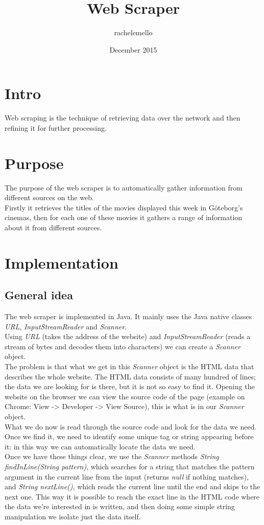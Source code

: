 \documentclass{article}
\title{Web Scraper}
\author{rachelemello }
\date{December 2015}
\begin{document}
\maketitle
\section{Intro}
Web scraping is the technique of retrieving data over the network and then refining it for further processing.


\section{Purpose}
The purpose of the web scraper is to automatically gather information from different sources on the web.\\
Firstly it retrieves the titles of the movies displayed this week in Göteborg's cinemas, then for each one of these movies it gathers a range of information about it from different sources.

\section{Implementation}
\subsection{General idea}
The web scraper is implemented in Java. It mainly uses the Java native classes \textit{URL}, \textit{InputStreamReader} and \textit{Scanner}.\\
Using \textit{URL} (takes the address of the website) and \textit{InputStreamReader} (reads a stream of bytes and decodes them into characters) we can create a \textit{Scanner} object. \\
The problem is that what we get in this \textit{Scanner} object is the HTML data that describes the whole website. The HTML data consists of many hundred of lines; the data we are looking for is there, but it is not so easy to find it. Opening the website on the browser we can view the source code of the page (example on Chrome: View -> Developer -> View Source), this is what is in our \textit{Scanner} object.\\
What we do now is read through the source code and look for the data we need. Once we find it, we need to identify some unique tag or string appearing before it: in this way we can automatically locate the data we need.\\
Once we have these things clear, we use the \textit{Scanner} methods \textit{String findInLine(String pattern)}, which searches for a string that matches the pattern argument in the current line from the input (returns \textit{null} if nothing matches), and \textit{String nextLine()}, which reads the current line until the end and skips to the next one. This way it is possible to reach the exact line in the HTML code where the data we're interested in is written, and then doing some simple string manipulation we isolate just the data itself.
\end{document}
